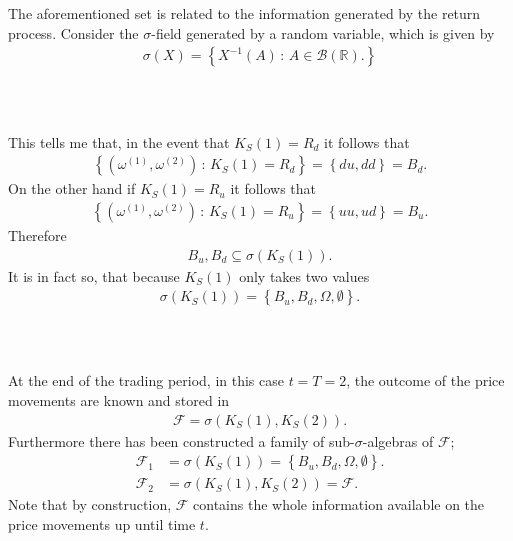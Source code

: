 \documentclass{beamer}
\numberwithin{equation}{section}
\begin{document}
\begin{frame}\frametitle{{\normalsize \secname} \\ {\large \subsecname}}
    The aforementioned set is related to the information generated by the return process.
    Consider the $\sigma$-field generated by a random variable, which is given by
    \begin{align}
        \sigma(X) = \left\{
            X^{-1}(A) \, : \, A \in \mathscr{B}(\mathbb{R}).
        \right\}
    \end{align}
\end{frame}

\begin{frame}\frametitle{{\normalsize \secname} \\ {\large \subsecname}}
    This tells me that, in the event that $K_S(1) = R_d$ it follows that
    \begin{align}
        \left\{
            \left(
                \omega^{(1)}, \omega^{(2)}
            \right)
            \, : \,
            K_S(1) = R_d
        \right\} =
        \left\{
            du, dd 
        \right\} = B_d.
    \end{align}
    On the other hand if $K_S(1) = R_u$ it follows that
    \begin{align}
        \left\{
            \left(
                \omega^{(1)}, \omega^{(2)}
            \right)
            \, : \,
            K_S(1) = R_u
        \right\} =
        \left\{
            uu, ud 
        \right\} = B_u.
    \end{align}
    Therefore
    \begin{align}
        B_u, B_d \subseteq \sigma\left(K_S(1)\right).
    \end{align}
    It is in fact so, that because $K_S(1)$ only takes two values
    \begin{align}
        \sigma(K_S(1)) = \left\{B_u, B_d, \Omega, \emptyset\right\}.
    \end{align}
\end{frame}

\begin{frame}\frametitle{{\normalsize \secname} \\ {\large \subsecname}}
    At the end of the trading period, in this case $t = T = 2$, the outcome of the price movements are known and stored in
    \begin{align}
        \mathscr{F} = \sigma\left(K_S(1), K_S(2)\right).
    \end{align}
    Furthermore there has been constructed a family of sub-$\sigma$-algebras of $\mathscr{F}$;
    \begin{align}
        \mathscr{F}_1 &= \sigma(K_S(1)) = \left\{B_u, B_d, \Omega, \emptyset\right\}. \\
        \mathscr{F}_2 &= \sigma(K_S(1), K_S(2)) = \mathscr{F}.
    \end{align}
    Note that by construction, $\mathscr{F}$ contains the whole information available on the price movements up until time $t$.
\end{frame}
\end{document}
